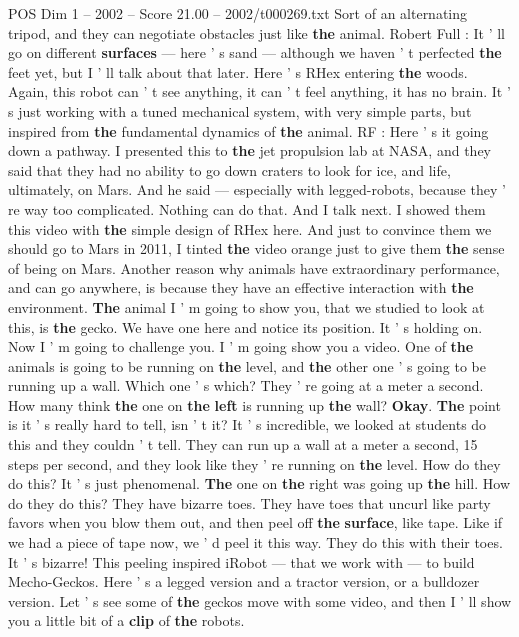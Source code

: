 \begin{textsample}{POS Dim 1 – 2002 – Score 21.00 – 2002/t000269.txt}
Sort of an alternating tripod, and they can negotiate obstacles just like \textbf{the} animal.
Robert Full : It ' ll go on different \textbf{surfaces} — here ' s sand — although we haven ' t perfected \textbf{the} feet yet, but I ' ll talk about that later.
Here ' s RHex entering \textbf{the} woods.
Again, this robot can ' t see anything, it can ' t feel anything, it has no brain.
It ' s just working with a tuned mechanical system, with very simple parts, but inspired from \textbf{the} fundamental dynamics of \textbf{the} animal.
RF : Here ' s it going down a pathway.
I presented this to \textbf{the} jet propulsion lab at NASA, and they said that they had no ability to go down craters to look for ice, and life, ultimately, on Mars.
And he said — especially with legged-robots, because they ' re way too complicated.
Nothing can do that.
And I talk next.
I showed them this video with \textbf{the} simple design of RHex here.
And just to convince them we should go to Mars in 2011, I tinted \textbf{the} video orange just to give them \textbf{the} sense of being on Mars.
Another reason why animals have extraordinary performance, and can go anywhere, is because they have an effective interaction with \textbf{the} environment. \textbf{The} animal I ' m going to show you, that we studied to look at this, is \textbf{the} gecko.
We have one here and notice its position.
It ' s holding on.
Now I ' m going to challenge you.
I ' m going show you a video.
One of \textbf{the} animals is going to be running on \textbf{the} level, and \textbf{the} other one ' s going to be running up a wall.
Which one ' s which?
They ' re going at a meter a second.
How many think \textbf{the} one on \textbf{the} \textbf{left} is running up \textbf{the} wall? \textbf{Okay}. \textbf{The} point is it ' s really hard to tell, isn ' t it?
It ' s incredible, we looked at students do this and they couldn ' t tell.
They can run up a wall at a meter a second, 15 steps per second, and they look like they ' re running on \textbf{the} level.
How do they do this?
It ' s just phenomenal. \textbf{The} one on \textbf{the} right was going up \textbf{the} hill.
How do they do this?
They have bizarre toes.
They have toes that uncurl like party favors when you blow them out, and then peel off \textbf{the} \textbf{surface}, like tape.
Like if we had a piece of tape now, we ' d peel it this way.
They do this with their toes.
It ' s bizarre!
This peeling inspired iRobot — that we work with — to build Mecho-Geckos.
Here ' s a legged version and a tractor version, or a bulldozer version.
Let ' s see some of \textbf{the} geckos move with some video, and then I ' ll show you a little bit of a \textbf{clip} of \textbf{the} robots.

\end{textsample}
